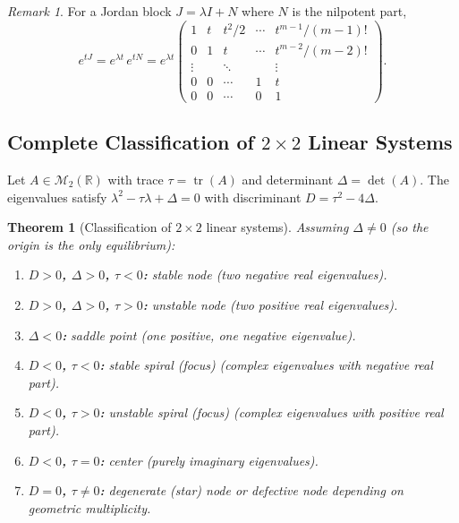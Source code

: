 \documentclass[12pt,a4paper,openany]{book}
\theoremstyle{definition}
\theoremstyle{plain}
\newtheorem{theorem}[definition]{Theorem}
\theoremstyle{remark}
\newtheorem{remark}[definition]{Remark}
\newcommand{\R}{\mathbb{R}}
\DeclareMathOperator{\tr}{tr}
\begin{document}
\begin{remark}\label{rem:exp-jordan-block}
For a Jordan block $J = \lambda I + N$ where $N$ is the nilpotent part,
\[
  e^{tJ} = e^{\lambda t}\,e^{tN}
  = e^{\lambda t}\begin{pmatrix}
    1 & t & t^2/2 & \cdots & t^{m-1}/(m-1)!\\
    0 & 1 & t & \cdots & t^{m-2}/(m-2)!\\
    \vdots & & \ddots & & \vdots \\
    0 & 0 & \cdots & 1 & t \\
    0 & 0 & \cdots & 0 & 1
  \end{pmatrix}.
\]
\end{remark}

\subsection{Complete Classification of $2\times 2$ Linear Systems}
\label{subsec:2x2-classification}

Let $A\in\mathcal{M}_2(\R)$ with trace $\tau = \tr(A)$ and determinant
$\Delta = \det(A)$.  The eigenvalues satisfy
$\lambda^2 - \tau\lambda + \Delta = 0$
with discriminant $D = \tau^2 - 4\Delta$.

\begin{theorem}[Classification of $2\times 2$ linear systems]\label{thm:2x2-class}
Assuming $\Delta\neq 0$ (so the origin is the only equilibrium):
\begin{enumerate}[label=(\roman*)]
  \item \textbf{$D>0$, $\Delta>0$, $\tau<0$:} stable node
     (two negative real eigenvalues).
  \item \textbf{$D>0$, $\Delta>0$, $\tau>0$:} unstable node
     (two positive real eigenvalues).
  \item \textbf{$\Delta<0$:} saddle point
     (one positive, one negative eigenvalue).
  \item \textbf{$D<0$, $\tau<0$:} stable spiral (focus)
     (complex eigenvalues with negative real part).
  \item \textbf{$D<0$, $\tau>0$:} unstable spiral (focus)
     (complex eigenvalues with positive real part).
  \item \textbf{$D<0$, $\tau=0$:} center
     (purely imaginary eigenvalues).
  \item \textbf{$D=0$, $\tau\neq 0$:} degenerate (star) node
     or defective node depending on
    geometric multiplicity.
\end{enumerate}
\end{theorem}
\end{document}

